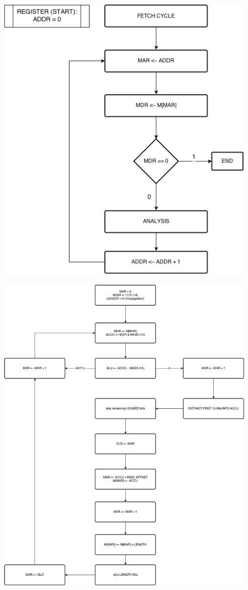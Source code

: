 \documentclass[12pt,titlepage]{article}
\begin{document}
\includegraphics[width=13cm]{readFromMemory.png}

\includegraphics[width=13cm]{algo_flow.png}
\end{document}
